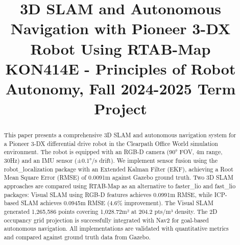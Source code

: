 \documentclass[conference]{IEEEtran}
\begin{document}
\title{3D SLAM and Autonomous Navigation with Pioneer 3-DX Robot Using RTAB-Map\\
{\footnotesize KON414E - Principles of Robot Autonomy, Fall 2024-2025 Term Project}
}

\author{
\and
{}
\and
{}
}

\maketitle

\begin{abstract}
This paper presents a comprehensive 3D SLAM and autonomous navigation system for a Pioneer 3-DX differential drive robot in the Clearpath Office World simulation environment. The robot is equipped with an RGB-D camera (90° FOV, 4m range, 30Hz) and an IMU sensor (±0.1°/s drift). We implement sensor fusion using the robot\_localization package with an Extended Kalman Filter (EKF), achieving a Root Mean Square Error (RMSE) of 0.0091m against Gazebo ground truth. Two 3D SLAM approaches are compared using RTAB-Map as an alternative to faster\_lio and fast\_lio packages: Visual SLAM using RGB-D features achieves 0.0991m RMSE, while ICP-based SLAM achieves 0.0945m RMSE (4.6\% improvement). The Visual SLAM generated 1,265,586 points covering 1,028.72m² at 204.2 pts/m³ density. The 2D occupancy grid projection is successfully integrated with Nav2 for goal-based autonomous navigation. All implementations are validated with quantitative metrics and compared against ground truth data from Gazebo.
\end{abstract}
\end{document}
